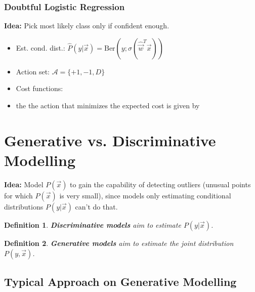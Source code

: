 \documentclass[8pt,a4paper]{scrartcl}
\newtheorem{define}{Definition}
\begin{document}
\begin{multicols*}{3}
\subsubsection{Doubtful Logistic Regression}

\textbf{Idea:} Pick most likely class only if confident enough.

\begin{itemize}
\ncompaq
\item Est. cond. dist.: $\hat{P}(y|\vec{x})=\text{Ber}(y;\sigma(\hat{\vec{w}}^T\vec{x}))$
\item Action set: $\mathcal{A}=\{+1,-1,D\}$
\item Cost functions:

\item the the action that minimizes the expected cost is given by

\end{itemize}

\section{Generative vs. Discriminative Modelling}

\textbf{Idea:} Model $P(\vec{x})$ to gain the capability of detecting outliers (unusual points for which $P(\vec{x})$ is very small), since models only estimating conditional distributions $P(y|\vec{x})$ can't do that.

\begin{define}
\textbf{Discriminative models} aim to estimate $P(y|\vec{x})$.
\end{define}

\begin{define}
\textbf{Generative models} aim to estimate the joint distribution $P(y,\vec{x})$.
\end{define}

\subsection{Typical Approach on Generative Modelling}


\end{multicols*}
\end{document}
